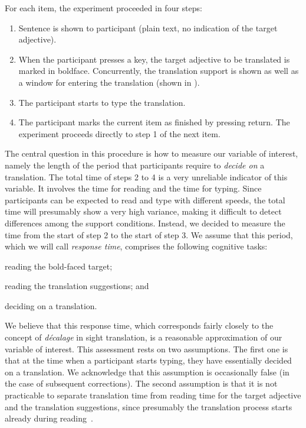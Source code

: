 \documentclass[output=paper]{LSP/langsci}
\begin{document}
For each item, the experiment proceeded in four steps:
\begin{enumerate}
\item Sentence is shown to participant (plain text, no indication of
  the target adjective).
  \newpage 
\item When the participant presses a key, the target adjective to be
  translated is marked in boldface. Concurrently, the translation
  support is shown as well as a window for entering the translation
  (shown in ).
\item The participant starts to type the translation.
\item The participant marks the current item as finished by pressing
  return. The experiment proceeds directly to step 1 of the next item.
\end{enumerate}
%

The central question in this procedure is how to measure our variable
of interest, namely the length of the period that participants require
to \textit{decide on} a translation. The total time of steps 2 to 4 is
a very unreliable indicator of this variable. It involves the time for
reading and the time for typing. Since participants can be expected to
read and type with different speeds, the total time will presumably
show a very high variance, making it difficult to detect differences
among the support conditions. Instead, we decided to measure the time
from the start of step 2 to the start of step 3. We assume that this
period, which we will call \textit{response time},
comprises the following cognitive tasks:
\begin{inparaenum}[(a)]
\item reading the bold-faced target;
\item reading the translation suggestions; and
\item deciding on a translation.
\end{inparaenum}
We believe that this response time, which corresponds fairly closely
to the concept of \textit{décalage} in sight translation, is a
reasonable approximation of our variable of interest. This assessment
rests on two assumptions. The first one is that at the time when a
participant starts typing, they have essentially decided on a
translation. We acknowledge that this assumption is occasionally false
(in the case of subsequent corrections). The second assumption is that
it is not practicable to separate translation time from reading time
for the target adjective and the translation suggestions, since
presumably the translation process starts already during
reading~\citep{John:1996:TTP:1462965.1462967,
  carl12:_insid_monit_model}.
\end{document}
